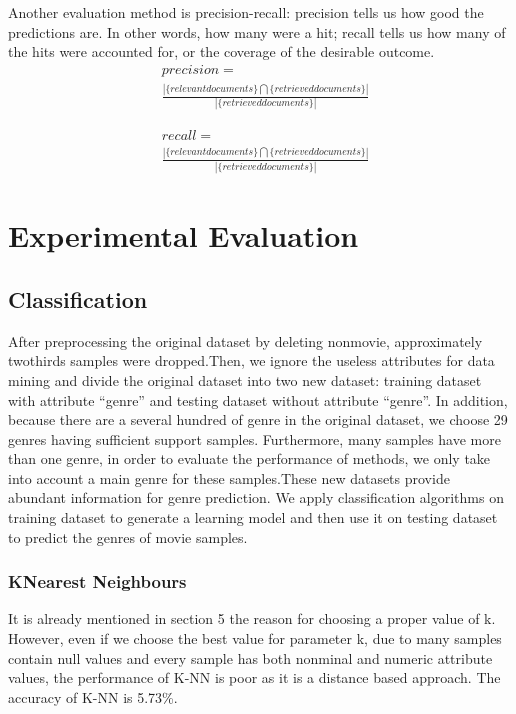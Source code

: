 \documentclass[conference]{IEEEtran}
\begin{document}
Another evaluation method is precision-recall: precision tells us how good the predictions are. In other words, how many were a hit; recall tells us how many of the hits were accounted for, or the coverage of the desirable outcome.
\begin{equation}
\begin{split}
& precision = \\
& \frac{\left|\{relevant documents\}\bigcap \{retrieved documents\}\right|}{\left|\{retrieved documents\}\right|}
\end{split}
\end{equation}

\begin{equation}
\begin{split}
& recall = \\
&\frac{\left|\{relevant documents\}\bigcap \{retrieved documents\}\right|}{\left|\{retrieved documents\}\right|}
\end{split}
\end{equation}


\section{Experimental Evaluation }
\subsection{Classification}
After preprocessing the original dataset by deleting non­movie, approximately two­thirds samples were dropped.Then, we ignore the useless attributes for data mining and divide the original dataset into two new dataset: training dataset with attribute “genre” and testing dataset without attribute “genre”. In addition, because there are a several hundred of genre in the original dataset, we choose 29 genres having sufficient support samples. Furthermore, many samples have more than one genre, in order to evaluate the performance of methods, we only take into account a main genre for these samples.These new datasets provide abundant information for genre prediction. We apply classification algorithms on training dataset to generate a learning model and then use it on testing dataset to predict the genres of movie samples.
\subsubsection{K­Nearest Neighbours}
It is already mentioned in section 5 the reason for choosing a proper value of k. However, even if we choose the best value for parameter k, due to many samples contain null values and every sample has both nonminal and numeric attribute values, the performance of K­-NN is poor as it is a distance based approach. The accuracy of K-NN is 5.73\%.
\end{document}
